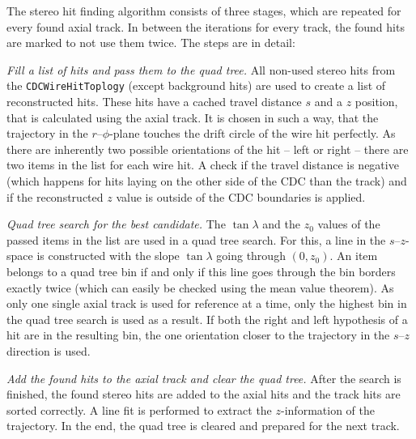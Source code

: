 The stereo hit finding algorithm consists of three stages, which are repeated for every found axial track. In between the iterations for every track, the found hits are marked to not use them twice. The steps are in detail:
\begin{zlist}
  \item \textit{Fill a list of hits and pass them to the quad tree.} All non-used stereo hits from the \texttt{CDCWireHitToplogy} (except background hits) are used to create a list of reconstructed hits. These hits have a cached travel distance $s$ and a $z$ position, that is calculated using the axial track. It is chosen in such a way, that the trajectory in the $r$--$\phi$-plane touches the drift circle of the wire hit perfectly. As there are inherently two possible orientations of the hit -- left or right -- there are two items in the list for each wire hit. A check if the travel distance is negative (which happens for hits laying on the other side of the CDC than the track) and if the reconstructed $z$ value is outside of the CDC boundaries is applied. 
  \item \textit{Quad tree search for the best candidate.} The $\tan \lambda$ and the $z_0$ values of the passed items in the list are used in a quad tree search. For this, a line in the $s$--$z$-space is constructed with the slope $\tan \lambda$ going through $(0, z_0)$. An item belongs to a quad tree bin if and only if this line goes through the bin borders exactly twice (which can easily be checked using the mean value theorem). As only one single axial track is used for reference at a time, only the highest bin in the quad tree search is used as a result. If both the right and left hypothesis of a hit are in the resulting bin, the one orientation closer to the trajectory in the $s$--$z$ direction is used.
  \item \textit{Add the found hits to the axial track and clear the quad tree.} After the search is finished, the found stereo hits are added to the axial hits and the track hits are sorted correctly. A line fit is performed to extract the $z$-information of the trajectory. In the end, the quad tree is cleared and prepared for the next track.
\end{zlist}


